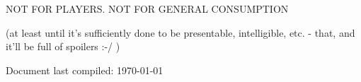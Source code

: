 \vspace{1cm}
\centerline{\LARGE NOT FOR PLAYERS. NOT FOR GENERAL CONSUMPTION }
\vspace{0.5cm}
\centerline{(at least until it's sufficiently done to be presentable, intelligible, etc. - that, and it'll be full of spoilers :-/ )}
\vspace{3cm}
\centerline{Document last compiled: \today}

